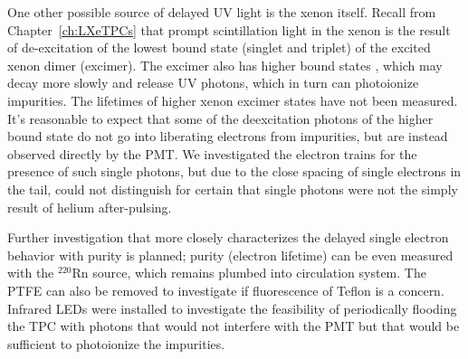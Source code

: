 One other possible source of delayed UV light is the xenon itself. Recall from Chapter~\ref{ch:LXeTPCs} that prompt scintillation light in the xenon is the result of de-excitation of the lowest bound state (singlet and triplet) of the excited xenon dimer (excimer). The excimer also has higher bound states \cite{Ermler1979}, which may decay more slowly and release UV photons, which in turn can photoionize impurities. The lifetimes of higher xenon excimer states have not been measured. It's reasonable to expect that some of the deexcitation photons of the higher bound state do not go into liberating electrons from impurities, but are instead observed directly by the \ac{PMT}. We investigated the electron trains for the presence of such single photons, but due to the close spacing of single electrons in the tail, could not distinguish for certain that single photons were not the simply result of helium after-pulsing. 

Further investigation that more closely characterizes the delayed single electron behavior with purity is planned; purity (electron lifetime) can be even measured with the $^{220}$Rn source, which remains plumbed into circulation system. The \ac{PTFE} can also be removed to investigate if fluorescence of Teflon is a concern. Infrared LEDs were installed to investigate the feasibility of periodically flooding the \ac{TPC} with photons that would not interfere with the \ac{PMT} but that would be sufficient to photoionize the impurities. 



